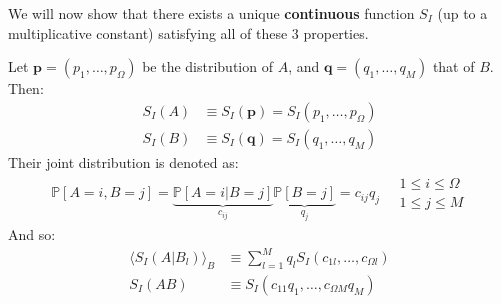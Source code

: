 \documentclass[../../main.tex]{subfiles}
\begin{document}
We will now show that there exists a unique \textbf{continuous} function $S_I$ (up to a multiplicative constant) satisfying all of these $3$ properties.

\medskip

Let $\bm{p} = (p_1,\dots,p_\Omega)$ be the distribution of $A$, and $\bm{q} = (q_1,\dots, q_{M})$ that of $B$. Then:
\begin{align*}
    S_I(A) &\equiv S_I(\bm{p}) = S_I(p_1, \dots, p_\Omega)\\
    S_I(B) &\equiv S_I(\bm{q}) = S_I(q_1, \dots, q_M)
\end{align*}
Their joint distribution is denoted as:
\begin{align*}
    \mathbb{P}[A=i, B=j] = \underbrace{\mathbb{P}[A=i|B=j]}_{c_{ij}}  \underbrace{\mathbb{P}[B=j]}_{q_j} = c_{ij} q_j \quad \substack{1 \leq i \leq \Omega\\1 \leq j \leq M}
\end{align*}
And so:
\begin{align*}
    \langle S_I(A|B_l) \rangle_B &\equiv \sum_{l=1}^M q_l S_I(c_{1l}, \dots, c_{\Omega l})\\
    S_I(AB) &\equiv S_I(c_{11} q_1, \dots, c_{\Omega M} q_M)
\end{align*}
\end{document}
